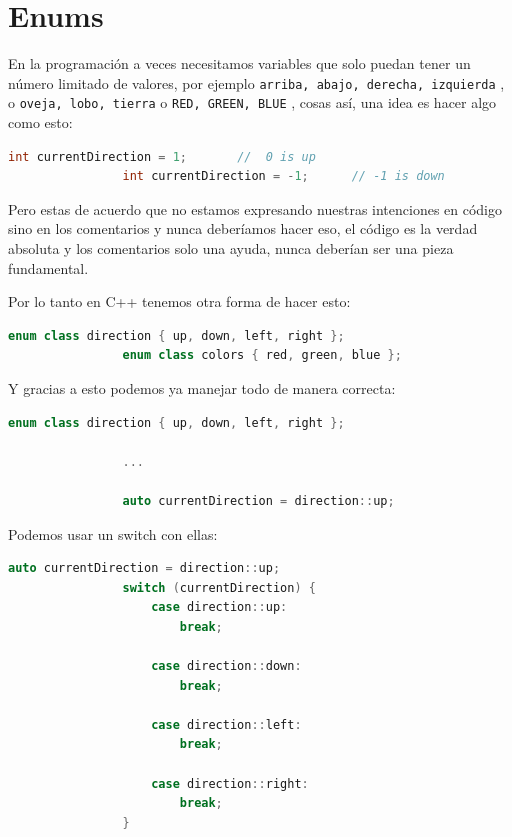 \documentclass[12pt, fleqn]{report}                             %
\theoremstyle{break}                                            %
\newcommand{\textCode}[1]  { \texttt{#1} }                      %
\begin{document}
        \clearpage
        \section{Enums}

            En la programación a veces necesitamos variables que solo puedan 
            tener un número limitado de valores, por ejemplo \textCode{arriba, abajo, derecha, izquierda},
            o \textCode{oveja, lobo, tierra} o \textCode{RED, GREEN, BLUE}, cosas así, una idea es
            hacer algo como esto:
            \begin{lstlisting}[language=C++, gobble=16]
                int currentDirection = 1;       //  0 is up
                int currentDirection = -1;      // -1 is down
            \end{lstlisting}

            Pero estas de acuerdo que no estamos expresando nuestras intenciones en código sino
            en los comentarios y nunca deberíamos hacer eso, el código es la verdad absoluta
            y los comentarios solo una ayuda, nunca deberían ser una pieza fundamental.

            Por lo tanto en C++ tenemos otra forma de hacer esto:
            \begin{lstlisting}[language=C++, gobble=16]
                enum class direction { up, down, left, right };
                enum class colors { red, green, blue };
            \end{lstlisting}

            Y gracias a esto podemos ya manejar todo de manera correcta:
            \begin{lstlisting}[language=C++, gobble=16]
                enum class direction { up, down, left, right };
                
                ...
                
                auto currentDirection = direction::up;
            \end{lstlisting}

            Podemos usar un switch con ellas:
            \begin{lstlisting}[language=C++, gobble=16]
                auto currentDirection = direction::up;
                switch (currentDirection) {
                    case direction::up: 
                        break;
                    
                    case direction::down: 
                        break;
                    
                    case direction::left: 
                        break;
                    
                    case direction::right: 
                        break;
                }
            \end{lstlisting}
\end{document}
